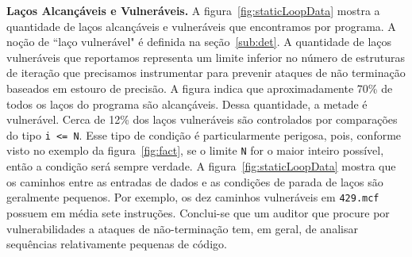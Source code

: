 \documentclass{llncs}
\begin{document}
\noindent
\textbf{Laços Alcançáveis e Vulneráveis. }
A figura~\ref{fig:staticLoopData} mostra a quantidade de laços alcançáveis e
vulneráveis que encontramos por programa.
A noção de ``laço vulnerável" é definida na seção~\ref{sub:det}.
A quantidade de laços vulneráveis que reportamos representa um limite inferior
no número de estruturas de iteração que precisamos instrumentar para prevenir
ataques de não terminação baseados em estouro de precisão.
A figura indica que aproximadamente 70\% de todos os laços do programa
são alcançáveis.
Dessa quantidade, a metade é vulnerável.
Cerca de 12\% dos laços vulneráveis são controlados por comparações do
tipo \texttt{i <= N}.
Esse tipo de condição é particularmente perigosa, pois, conforme visto no
exemplo da figura~\ref{fig:fact}, se o limite \texttt{N} for o
maior inteiro possível, então a condição será sempre verdade.
A figura~\ref{fig:staticLoopData} mostra que os caminhos entre as entradas de
dados e as condições de parada de laços são geralmente pequenos.
Por exemplo, os dez caminhos vulneráveis em \texttt{429.mcf} possuem em média
sete instruções.
Conclui-se que um auditor que procure por vulnerabilidades a ataques de
não-terminação tem, em geral, de analisar sequências relativamente
pequenas de código.
\end{document}
